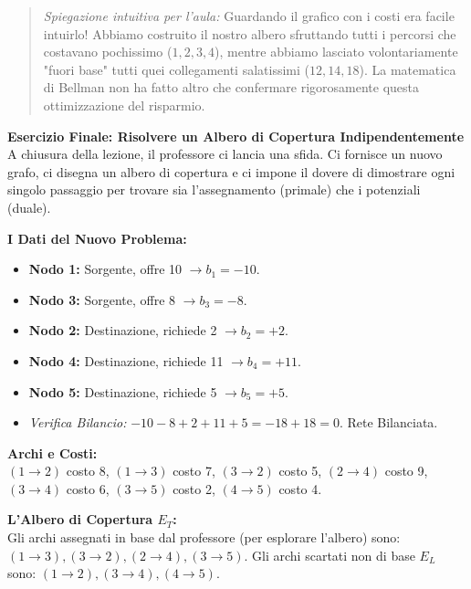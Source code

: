 \documentclass[12pt, a4paper]{article}
\newcommand{\separatore}{\noindent{\color{titlecolor!50}\rule{\textwidth}{0.6pt}}}
\begin{document}
	\begin{quote}
		\textit{Spiegazione intuitiva per l'aula:} Guardando il grafico con i costi era facile intuirlo! Abbiamo costruito il nostro albero sfruttando tutti i percorsi che costavano pochissimo ($1, 2, 3, 4$), mentre abbiamo lasciato volontariamente "fuori base" tutti quei collegamenti salatissimi ($12, 14, 18$). La matematica di Bellman non ha fatto altro che confermare rigorosamente questa ottimizzazione del risparmio.
	\end{quote}
	
	\vspace{0.6cm}
	\separatore
	\vspace{0.4cm}
	
	\textbf{Esercizio Finale: Risolvere un Albero di Copertura Indipendentemente}\\
	A chiusura della lezione, il professore ci lancia una sfida. Ci fornisce un nuovo grafo, ci disegna un albero di copertura e ci impone il dovere di dimostrare ogni singolo passaggio per trovare sia l'assegnamento (primale) che i potenziali (duale).
	
	\textbf{I Dati del Nuovo Problema:}
	\begin{itemize}[label=$\circ$, itemsep=2pt, leftmargin=1.5cm]
		\item \textbf{Nodo 1:} Sorgente, offre 10 $\rightarrow b_1 = -10$.
		\item \textbf{Nodo 3:} Sorgente, offre 8 $\rightarrow b_3 = -8$.
		\item \textbf{Nodo 2:} Destinazione, richiede 2 $\rightarrow b_2 = +2$.
		\item \textbf{Nodo 4:} Destinazione, richiede 11 $\rightarrow b_4 = +11$.
		\item \textbf{Nodo 5:} Destinazione, richiede 5 $\rightarrow b_5 = +5$.
		\item \textit{Verifica Bilancio:} $-10 - 8 + 2 + 11 + 5 = -18 + 18 = 0$. Rete Bilanciata.
	\end{itemize}
	
	\textbf{Archi e Costi:}\\
	$(1\to2)$ costo 8, $(1\to3)$ costo 7, $(3\to2)$ costo 5, $(2\to4)$ costo 9, $(3\to4)$ costo 6, $(3\to5)$ costo 2, $(4\to5)$ costo 4.
	
	\textbf{L'Albero di Copertura $E_T$:}\\
	Gli archi assegnati in base dal professore (per esplorare l'albero) sono: \textbf{$(1\to3), (3\to2), (2\to4), (3\to5)$}.
	Gli archi scartati non di base $E_L$ sono: $(1\to2), (3\to4), (4\to5)$.
	
\end{document}
